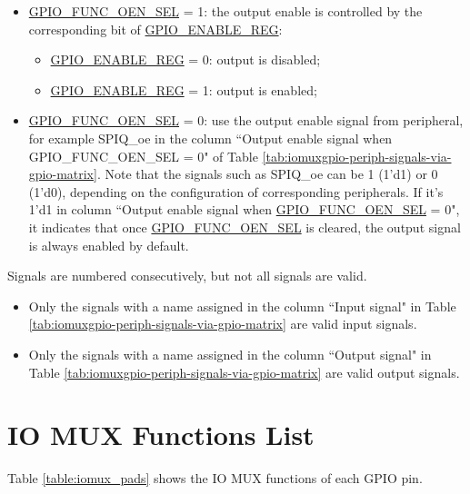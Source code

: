 \documentclass[main\_\_EN.tex]{subfiles}
\begin{document}
\begin{itemize}
    \item \hyperref[fielddesc:GPIOFUNCNOENSEL]{GPIO\_FUNC\_OEN\_SEL} = 1: the output enable is controlled by the corresponding bit  of \hyperref[regdesc:GPIOENABLEREG]{GPIO\_ENABLE\_REG}:
    \begin{itemize}
        \item \hyperref[regdesc:GPIOENABLEREG]{GPIO\_ENABLE\_REG} = 0: output is disabled;
        \item \hyperref[regdesc:GPIOENABLEREG]{GPIO\_ENABLE\_REG} = 1: output is enabled;
    \end{itemize}
    \item \hyperref[fielddesc:GPIOFUNCNOENSEL]{GPIO\_FUNC\_OEN\_SEL} = 0: use the output enable signal from peripheral, for example SPIQ\_oe in the column ``Output enable signal when GPIO\_FUNC\_OEN\_SEL = 0" of Table \ref{tab:iomuxgpio-periph-signals-via-gpio-matrix}. Note that the signals such as SPIQ\_oe can be 1 (1'd1) or 0 (1'd0), depending on the configuration of corresponding peripherals. If it's 1'd1 in column ``Output enable signal when \hyperref[fielddesc:GPIOFUNCNOENSEL]{GPIO\_FUNC\_OEN\_SEL} = 0", it indicates that once  \hyperref[fielddesc:GPIOFUNCNOENSEL]{GPIO\_FUNC\_OEN\_SEL} is cleared, the output signal is always enabled by default.
\end{itemize}

\begin{tiplisting}
Signals are numbered consecutively, but not all signals are valid.
\vspace{-1em}
\begin{itemize}
    \item Only the signals with a name assigned in the column ``Input signal" in Table \ref{tab:iomuxgpio-periph-signals-via-gpio-matrix} are valid input signals.
    \item Only the signals with a name assigned in the column ``Output signal" in Table \ref{tab:iomuxgpio-periph-signals-via-gpio-matrix} are valid output signals. 
\end{itemize}
\end{tiplisting}

\begin{landscape}



\end{landscape}
\section{IO MUX Functions List}
\label{sec:iomux_pads}
Table \ref{table:iomux_pads} shows the IO MUX functions of each GPIO pin.
\end{document}
